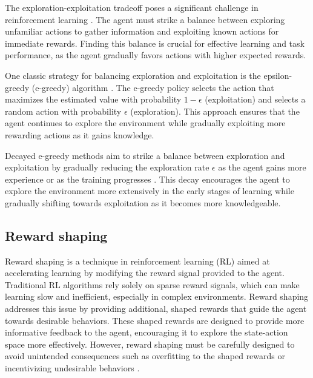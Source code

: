 The exploration-exploitation tradeoff poses a significant challenge in reinforcement learning \cite{sutton2018reinforcement}. The agent must strike a balance between exploring unfamiliar actions to gather information and exploiting known actions for immediate rewards. Finding this balance is crucial for effective learning and task performance, as the agent gradually favors actions with higher expected rewards.

One classic strategy for balancing exploration and exploitation is the epsilon-greedy (e-greedy) algorithm \cite{sutton2018reinforcement}. The e-greedy policy selects the action that maximizes the estimated value with probability $1 - \epsilon$ (exploitation) and selects a random action with probability $\epsilon$ (exploration). This approach ensures that the agent continues to explore the environment while gradually exploiting more rewarding actions as it gains knowledge.

Decayed e-greedy methods aim to strike a balance between exploration and exploitation by gradually reducing the exploration rate $\epsilon$ as the agent gains more experience or as the training progresses \cite{sutton2018reinforcement}. This decay encourages the agent to explore the environment more extensively in the early stages of learning while gradually shifting towards exploitation as it becomes more knowledgeable.

\subsection{Reward shaping}

Reward shaping is a technique in reinforcement learning (RL) aimed at accelerating learning by modifying the reward signal provided to the agent. Traditional RL algorithms rely solely on sparse reward signals, which can make learning slow and inefficient, especially in complex environments. Reward shaping addresses this issue by providing additional, shaped rewards that guide the agent towards desirable behaviors. These shaped rewards are designed to provide more informative feedback to the agent, encouraging it to explore the state-action space more effectively. However, reward shaping must be carefully designed to avoid unintended consequences such as overfitting to the shaped rewards or incentivizing undesirable behaviors \cite{russel2020ai}.
